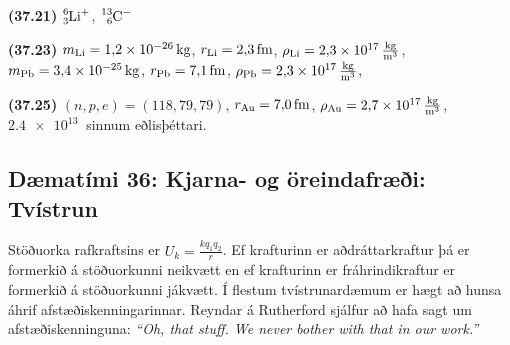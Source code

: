 \ifdefined \wholebook \else\documentclass[oneside]{book}\usepackage{EdlBook}\graphicspath{{figures/}}
\begin{document}
\begin{tcolorbox}
\begin{enumerate*}[label = ]
  \item \textbf{(37.21)} $\ce{^{6}_{3}Li^{+}}$, $\ce{^{13}_{6}C^{-}}$
  \item \textbf{(37.23)} $m_{{\ce{Li}}} = \SI{1.2e-26}{kg}$, $r_{{\ce{Li}}} = \SI{2.3}{fm}$, $\rho_{{\ce{Li}}} = \SI{2.3e17}{\frac{kg}{m^3}}$, $m_{{\ce{Pb}}} = \SI{3.4e-25}{kg}$, $r_{{\ce{Pb}}} = \SI{7.1}{fm}$, $\rho_{{\ce{Pb}}} = \SI{2.3e17}{\frac{kg}{m^3}}$,
  \item \textbf{(37.25)} $(n,p,e) = (118,79,79)$, $r_{\ce{Au}} = \SI{7.0}{fm}$, $\rho_{\ce{Au}} = \SI{2.7e17}{\frac{kg}{m^3}}$, $\SI{2.4e13}{}$ sinnum eðlisþéttari.
\end{enumerate*}
\end{tcolorbox}

\newpage

\subsection*{Dæmatími 36: Kjarna- og öreindafræði: Tvístrun}

\begin{tcolorbox}
Stöðuorka rafkraftsins er $U_k = \frac{kq_1 q_2}{r}$. Ef krafturinn er aðdráttarkraftur þá er formerkið á stöðuorkunni neikvætt en ef krafturinn er fráhrindikraftur er formerkið á stöðuorkunni jákvætt. Í flestum tvístrunardæmum er hægt að hunsa áhrif afstæðiskenningarinnar. Reyndar á Rutherford sjálfur að hafa sagt um afstæðiskenninguna: \textit{``Oh, that stuff. We never bother with that in our work.''}
\end{tcolorbox}
\end{document}
